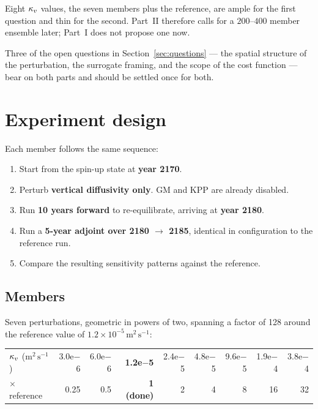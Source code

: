 Eight $\kappa_{v}$ values, the seven members plus the reference, are ample for the first
question and thin for the second. Part~II therefore calls for a $200$--$400$
member ensemble later; Part~I does not propose one now.

Three of the open questions in Section~\ref{sec:questions} --- the spatial
structure of the perturbation, the surrogate framing, and the scope of the cost
function --- bear on both parts and should be settled once for both.

\section{Experiment design}

Each member follows the same sequence:

\begin{enumerate}[nosep]
  \item Start from the spin-up state at \textbf{year 2170}.
  \item Perturb \textbf{vertical diffusivity only}. GM and KPP are already
        disabled.
  \item Run \textbf{10 years forward} to re-equilibrate, arriving at
        \textbf{year 2180}.
  \item Run a \textbf{5-year adjoint over 2180 $\rightarrow$ 2185}, identical in
        configuration to the reference run.
  \item Compare the resulting sensitivity patterns against the reference.
\end{enumerate}

\subsection{Members}

Seven perturbations, geometric in powers of two, spanning a factor of 128 around
the reference value of $1.2\times10^{-5}\,\mathrm{m^{2}\,s^{-1}}$:

\begin{center}
\footnotesize
\begin{tabular}{l*{8}{r}}
\toprule
$\kappa_{v}$ ($\mathrm{m^{2}\,s^{-1}}$)
 & 3.0e$-$6 & 6.0e$-$6 & \textbf{1.2e$-$5} & 2.4e$-$5
 & 4.8e$-$5 & 9.6e$-$5 & 1.9e$-$4 & 3.8e$-$4\\
$\times$ reference
 & 0.25 & 0.5 & \textbf{1 (done)} & 2 & 4 & 8 & 16 & 32\\
\bottomrule
\end{tabular}
\end{center}

